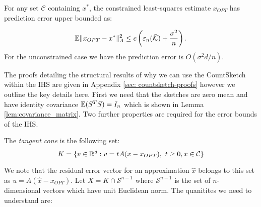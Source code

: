 \begin{prop} \label{prop: ihs-error-bound}
  For any set $\mathcal{C}$ containing $x^*$, the constrained least-squares
  estimate $x_{OPT}$ has prediction error upper bounded as:

  \begin{equation}
    \mathbb{E} \|x_{OPT} - x^* \|_A^2 \le c \left(\varepsilon_n(\mathcal{\bar{K}}) +
    \frac{\sigma^2}{n}\right).
  \end{equation}
  For the unconstrained case we have the prediction error is $O(\sigma^2 d/n)$.
\end{prop}

The proofs detailing the structural results of why we can use the CountSketch
within the IHS are given in Appendix \ref{sec: countsketch-proofs} however we
outline the key details here.
First we need that the sketches are zero mean and have identity covariance
$\mathbb{E}(S^TS) = I_{n}$ which is shown in Lemma \ref{lem:covariance_matrix}.
Two further properties are required for the error bounds of the IHS.

\begin{mydef}
  The \textit{tangent cone} is the following set:
  \begin{equation}
    K = \{ v \in \mathbb{R}^d : v = tA(x-x_{OPT}), ~ t \ge 0, x \in \mathcal{C}\}
  \end{equation}
\end{mydef}
\noindent We note that the residual error vector for an approximation $\hat{x}$
belongs to this set as $u=A(\hat{x} - x_{OPT})$.
Let $X = K \cap \mathcal{S}^{n-1}$ where $\mathcal{S}^{n-1}$ is the set of $n$-
dimensional vectors which have unit Euclidean norm.
The quanitites we need to understand are:

